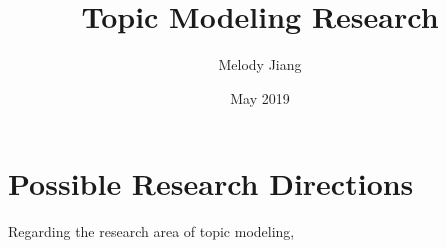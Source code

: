 \documentclass{article}
\title{Topic Modeling Research}
\author{Melody Jiang}
\date{May 2019}
\begin{document}
\maketitle

\section{Possible Research Directions}

Regarding the research area of topic modeling,
\end{document}

